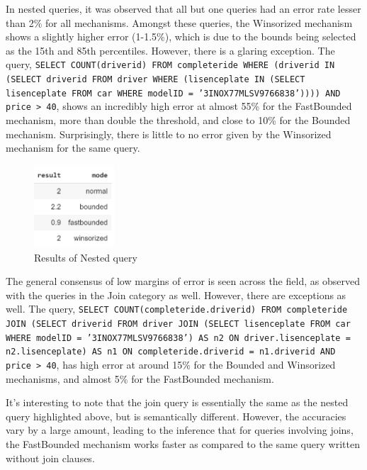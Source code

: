 \documentclass[acmsmall]{acmart}
\begin{document}
In nested queries, it was observed that all but one queries had an error rate lesser than 2\% for all mechanisms. Amongst these queries, the Winsorized mechanism shows a slightly higher error (1-1.5\%), which is due to the bounds being selected as the 15th and 85th percentiles. However, there is a glaring exception. The query, \texttt{SELECT COUNT(driver\textunderscore id) FROM completeride WHERE (driver\textunderscore id IN (SELECT driver\textunderscore id FROM driver WHERE (lisence\textunderscore plate IN (SELECT lisence\textunderscore plate FROM car WHERE model\textunderscore ID = '3INOX77MLSV9766838')))) AND price > 40}, shows an incredibly high error at almost 55\% for the FastBounded mechanism, more than double the threshold, and close to 10\% for the Bounded mechanism. Surprisingly, there is little to no error given by the Winsorized mechanism for the same query.

\begin{figure}[htp]
    \centering
    \includegraphics[width=3cm]{Fig 4.4.5.png}
    \caption{Results of Nested query}
    \label{Fig:4.4.5}
\end{figure}

The general consensus of low margins of error is seen across the field, as observed with the queries in the Join category as well. However, there are exceptions as well. The query, \texttt{SELECT COUNT(completeride.driver\textunderscore id) FROM completeride JOIN (SELECT driver\textunderscore id FROM driver JOIN (SELECT lisence\textunderscore plate FROM car WHERE model\textunderscore ID = '3INOX77MLSV9766838') AS n2 ON driver.lisence\textunderscore plate = n2.lisence\textunderscore plate) AS n1 ON completeride.driver\textunderscore id = n1.driver\textunderscore id AND price > 40}, has high error at around 15\% for the Bounded and Winsorized mechanisms, and almost 5\% for the FastBounded mechanism. 

It’s interesting to note that the join query is essentially the same as the nested query highlighted above, but is semantically different. However, the accuracies vary by a large amount, leading to the inference that for queries involving joins, the FastBounded mechanism works faster as compared to the same query written without join clauses.
\end{document}
